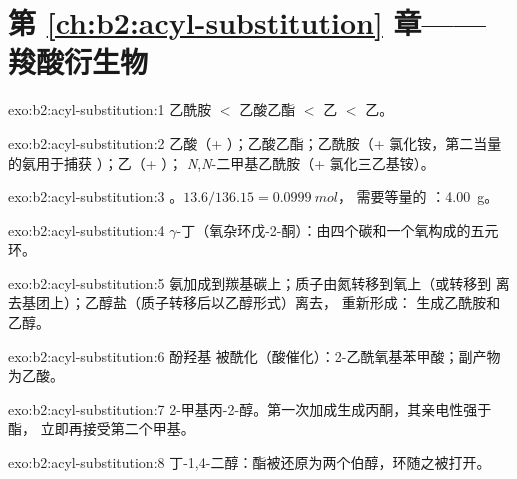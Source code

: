 \section*{第 \ref{ch:b2:acyl-substitution} 章——羧酸衍生物}

\begin{solution}{exo:b2:acyl-substitution:1}
乙酰胺 $<$ 乙酸乙酯 $<$ 乙 $<$ 乙。
\end{solution}

\begin{solution}{exo:b2:acyl-substitution:2}
乙酸（+ ）；乙酸乙酯；乙酰胺（+ 氯化铵，第二当量的氨用于捕获
）；乙（+ ）；
\textit{N},\textit{N}-二甲基乙酰胺（+ 氯化三乙基铵）。
\end{solution}

\begin{solution}{exo:b2:acyl-substitution:3}
。$13.6/136.15 = \qty{0.0999}{mol}$，
需要等量的 ：\qty{4.00}{g}。
\end{solution}

\begin{solution}{exo:b2:acyl-substitution:4}
$\gamma$-丁（氧杂环戊-2-酮）：由四个碳和一个氧构成的五元环。
\end{solution}

\begin{solution}{exo:b2:acyl-substitution:5}
氨加成到羰基碳上；质子由氮转移到氧上（或转移到
离去基团上）；乙醇盐（质子转移后以乙醇形式）离去， 重新形成：
生成乙酰胺和乙醇。
\end{solution}

\begin{solution}{exo:b2:acyl-substitution:6}
酚羟基  被酰化（酸催化）：2-乙酰氧基苯甲酸；副产物为乙酸。
\end{solution}

\begin{solution}{exo:b2:acyl-substitution:7}
2-甲基丙-2-醇。第一次加成生成丙酮，其亲电性强于酯，
立即再接受第二个甲基。
\end{solution}

\begin{solution}{exo:b2:acyl-substitution:8}
丁-1,4-二醇：酯被还原为两个伯醇，环随之被打开。
\end{solution}

